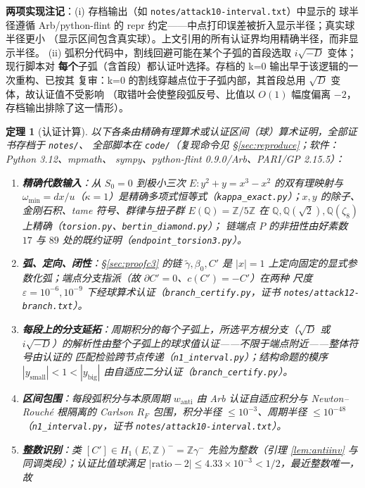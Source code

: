 \documentclass[11pt,a4paper]{ctexart}
\newtheorem{theorem}{定理}
\theoremstyle{remark}
\newcommand{\QQ}{\mathbb{Q}}
\newcommand{\ZZ}{\mathbb{Z}}
\begin{document}
\textbf{两项实现注记}：(i) 存档输出（如 \texttt{notes/attack10-interval.txt}）中显示的
球半径遵循 Arb/python-flint 的 repr 约定——中点打印误差被折入显示半径；真实球半径更小
（显示区间包含真实球）。上文引用的所有认证界均用精确半径，而非显示半径。
(ii) 弧积分代码中，割线回避可能在某个子弧的首段选取 $i\sqrt{-D}$ 变体；现行脚本对
\textbf{每个}子弧（含首段）都认证叶选择。存档的 k=0 输出早于该逻辑的一次重构、已按其
复审：k=0 的割线穿越点位于子弧内部，其首段总用 $\sqrt D$ 变体，故认证值不受影响
（取错叶会使整段弧反号、比值以 $O(1)$ 幅度偏离 $-2$，存档输出排除了这一情形）。

\begin{theorem}[认证计算]\label{thm:cert}
以下各条由精确有理算术或认证区间（球）算术证明，全部证书存档于 \texttt{notes/}、
全部脚本在 \texttt{code/}（复现命令见 \S\ref{sec:reproduce}；软件：Python 3.12、mpmath、
sympy、python-flint 0.9.0/Arb、PARI/GP 2.15.5）：
\begin{enumerate}[nosep]
\item \textbf{精确代数输入}：从 $S_0=0$ 到极小三次 $E:y^2+y=x^3-x^2$ 的双有理映射与
$\omega_{\min}=dx/u$（$\kappa=1$）是精确多项式恒等式（\texttt{kappa\_exact.py}）；$x,y$
的除子、金刚石积、tame 符号、群律与扭子群 $E(\QQ)=\ZZ/5\ZZ$ 在
$\QQ,\QQ(\sqrt2),\QQ(\zeta_8)$ 上精确（\texttt{torsion.py}、\texttt{bertin\_diamond.py}）；
链端点 $P$ 的非扭性由好素数 $17$ 与 $89$ 处的既约证明（\texttt{endpoint\_torsion3.py}）。
\item \textbf{弧、定向、闭性}：\S\ref{sec:proofc3} 的链 $\tilde\gamma,\beta_0,C'$ 是
$|x|=1$ 上定向固定的显式参数化弧；端点分支指派（故 $\partial C'=0$、$c(C')=-C'$）在两种
尺度 $\varepsilon=10^{-6},10^{-9}$ 下经球算术认证（\texttt{branch\_certify.py}，证书
\texttt{notes/attack12-branch.txt}）。
\item \textbf{每段上的分支延拓}：周期积分的每个子弧上，所选平方根分支（$\sqrt D$ 或
$i\sqrt{-D}$）的解析性由整个子弧上的球求值认证——不限于端点附近——整体符号由认证的
匹配检验跨节点传递（\texttt{n1\_interval.py}）；结构命题的模序
$|y_{\mathrm{small}}|<1<|y_{\mathrm{big}}|$ 由自适应二分认证（\texttt{branch\_certify.py}）。
\item \textbf{区间包围}：每段弧积分与本原周期 $w_{\mathrm{anti}}$ 由 Arb 认证自适应积分与
Newton--Rouch\'e 根隔离的 Carlson $R_F$ 包围，积分半径 $\le10^{-3}$、周期半径
$\le10^{-48}$（\texttt{n1\_interval.py}，证书 \texttt{notes/attack10-interval.txt}）。
\item \textbf{整数识别}：类 $[C']\in H_1(E,\ZZ)^-=\ZZ\gamma^-$ 先验为整数（引理
\ref{lem:antiinv} 与同调类段）；认证比值球满足
$|\mathrm{ratio}-2|\le4.33\times10^{-3}<1/2$，最近整数唯一，故

\end{enumerate}
\end{theorem}
\end{document}
